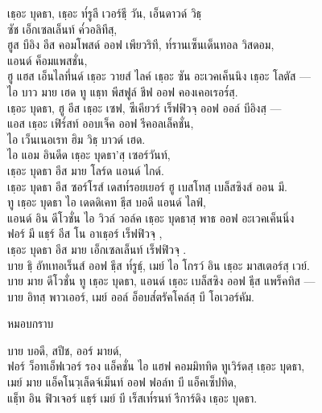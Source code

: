 \begin{leader}
\end{leader}

\begin{thaitrans}
เธฺอะ บุดธา, เธฺอะ ท๎รูลี เวอร์ธฺี วัน, เอ็นดาวด์ วิธฺ\\
\vin ซัช เอ็กเซลเล็นท์ ค๎วอลิทีสฺ,\\
ฮูส บีอิง อีส คอมโพสด์ ออฟ เพียวริที, ท๎รานเซ็นเด็นทอล วิสดอม,\\
\vin แอนด์ ค็อมแพสชั่น,\\
ฮู แฮส เอ็นไลทึ่นด์ เธฺอะ วายส์ ไลค์ เธฺอะ ซัน อะเวคเค็นนิง เธฺอะ โลตัส —\\
ไอ บาว มาย เฮด ทู แธฺท พีสฟูล์ ชีฟ ออฟ คองเคอเรอร๎สฺ.\\
เธฺอะ บุดธา, ฮู อีส เธฺอะ เซฟ, ซีเคียวร์ เร็ฟฟิวจฺ  ออฟ ออล์ บีอิงสฺ —\\
แอส เธฺอะ เฟิร๎สท์ ออบเจ็ค ออฟ รีคอลเล็คชั่น,\\
\vin ไอ เว็นเนอเรท ฮิม วิธฺ บาวด์ เฮด.\\
ไอ แอม อินดีด เธฺอะ บุดธา’สฺ เซอร์วันท์,\\
\vin เธฺอะ บุดธา อีส มาย โลร์ด แอนด์ ไกด์.\\
เธฺอะ บุดธา อีส ซอร์โรส์ เดสท๎รอยเยอร์ ฮู   เบสโทสฺ  เบล็สซิงส์ ออน มี.\\
ทู เธฺอะ บุดธา ไอ เดดดิเคท ธฺีส บอดี แอนด์ ไลฟ์,\\
แอนด์ อิน ดีโวชั่น ไอ วิวล์ วอล์ค เธฺอะ บุดธาสฺ  พาธ ออฟ อะเวคเค็นนิ่ง\\
ฟอร์ มี แธฺร์ อีส โน อาเธฺอร์ เร็ฟฟิวจฺ ,\\
\vin เธฺอะ บุดธา อีส มาย เอ็กเซลเล็นท์ เร็ฟฟิวจฺ .\\
บาย ธฺิ อัทเทอเร็นส์ ออฟ ธฺีส ท๎รูธฺ์, เมย์ ไอ โกรว์ อิน เธฺอะ มาสเตอร์สฺ  เวย์.\\
บาย มาย ดีโวชั่น ทู เธฺอะ บุดธา, แอนด์ เธฺอะ เบล็สซิง ออฟ ธฺีส แพร็คทิส —\\
บาย อิทสฺ  พาวเออร์, เมย์ ออล์ อ็อบส๎ตรัคโคล์สฺ บี โอเวอร์คัม.\\
\end{thaitrans}

\begin{instruction}
หมอบกราบ
\end{instruction}

\begin{thaitrans}
บาย บอดี, สปีช, ออร์ มายด์,\\
ฟอร์ ว็อทเอ็ฟเวอร์ รอง แอ็คชั่น ไอ แฮฟ คอมมิททิด ทูเวิร์ดสฺ  เธฺอะ บุดธา,\\
เมย์ มาย แอ็คโนวฺเล็ดจ์เม็นท์ ออฟ ฟอล์ท บี แอ็คเซ็ปทิด,\\
แธฺ็ท อิน ฟิวเจอร์ แธฺร์ เมย์ บี เร็สเท๎รนท์ รีการ์ดิง เธฺอะ บุดธา.\\
\end{thaitrans}
\clearpage

